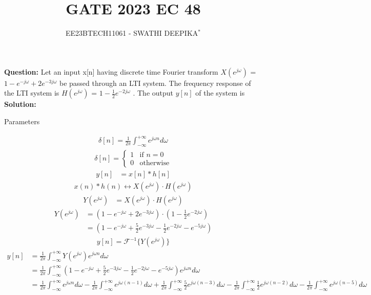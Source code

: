 \documentclass[journal,12pt,twocolumn]{IEEEtran}
\title{
	
\title{GATE 2023 EC 48}
\author{EE23BTECH11061 - SWATHI DEEPIKA$^{*}$%
}


}
\theoremstyle{remark}
\newcommand{\solution}{\noindent \textbf{Solution: }}
\begin{document}
\maketitle

\textbf{Question:} 
Let an input x[n] having discrete time Fourier transform
 $X(e^{j\omega})$  = $1 - e^{-j\omega} + 2e^{-3j\omega}$  be passed through an LTI system. The frequency response of the LTI system is  $H(e^{j\omega})$ = $1 - \frac{1}{2} e^{-2j\omega}$ . The output $y[n]$ of the system is \\  
\solution

 \begin{table}[h]
 	\centering
 	\resizebox{6 cm}{!}{
 		
 	}
 	\vspace{6 pt}
 	\caption{Parameters}
 	\label{tab:swag_tabel} 
 \end{table}
 
 \begin{align}
 \delta[n]=\frac{1}{2\pi}\int_{-\infty}^{+\infty} e^{j\omega n} d\omega
 \end{align}
\begin{align}
\delta[n] = \begin{cases} 1 & \text{if } n = 0 \\ 0 & \text{otherwise} \end{cases}
\end{align}
\begin{align}
y[n] &= x[n] * h[n]
\end{align}
\begin{align*}
x(n) * h(n) \longleftrightarrow X(e^{j\omega}) \cdot H(e^{j\omega})
\end{align*}
\begin{align}
Y(e^{j\omega}) &= X(e^{j\omega}) \cdot H(e^{j\omega})
\end{align}
\begin{align}
Y(e^{j\omega}) &= (1 - e^{-j\omega} + 2e^{-3j\omega}) \cdot \left(1 - \frac{1}{2}e^{-2j\omega}\right) \\
&= (1 - e^{-j\omega} + \frac{5}{2}e^{-3j\omega} - \frac{1}{2}e^{-2j\omega} - e^{-5j\omega})
\end{align}
\begin{align*}
y[n] = \mathcal{F}^{-1}\{ Y(e^{j\omega}) \}
\end{align*}
\begin{align}
y[n] &= \frac{1}{2\pi}\int_{-\infty}^{+\infty}  Y(e^{j\omega})e^{j\omega n} d\omega \\
&= \frac{1}{2\pi}\int_{-\infty}^{+\infty}  \left(1 - e^{-j\omega} + \frac{5}{2}e^{-3j\omega} - \frac{1}{2}e^{-2j\omega} - e^{-5j\omega}\right)e^{j\omega n} d\omega \\
&= \frac{1}{2\pi}\int_{-\infty}^{+\infty} e^{j\omega n} d\omega - \frac{1}{2\pi}\int_{-\infty}^{+\infty} e^{j\omega(n-1)} d\omega +\frac{1}{2\pi}\int_{-\infty}^{+\infty} \frac{5}{2}e^{j\omega (n-3)} d\omega 
- \frac{1}{2\pi}\int_{-\infty}^{+\infty} \frac{1}{2}e^{j\omega (n-2)} d\omega - \frac{1}{2\pi}\int_{-\infty}^{+\infty} e^{j\omega (n-5)} d\omega 
\end{align}
\end{document}
